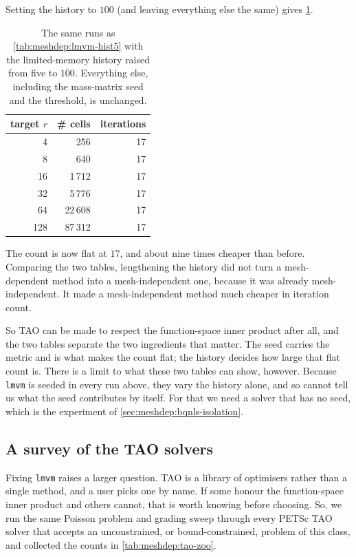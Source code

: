 \documentclass[a4paper,11pt]{article}
\theoremstyle{spacedplain} \newtheorem{theorem}[counter]{Theorem} \newtheorem{lemma}[counter]{Lemma} \newtheorem{prop}[counter]{Proposition} \newtheorem{cor}[counter]{Corollary}
\theoremstyle{spaceddefinition} \newtheorem{defn}[counter]{Definition} \newtheorem{example}[counter]{Example} \newtheorem{remark}[counter]{Remark}
\begin{document}
Setting the history to $100$ (and leaving everything else the same) gives \cref{tab:meshdep:lmvm-hist100}.

\begin{table}[H]
  \centering
  \begin{tabular}{r r r}
    \toprule
    {target $r$} & {\# cells} & {iterations} \\
    \midrule
      4 &     256 & 17 \\
      8 &     640 & 17 \\
     16 &   1\,712 & 17 \\
     32 &   5\,776 & 17 \\
     64 &  22\,608 & 17 \\
    128 &  87\,312 & 17 \\
    \bottomrule
  \end{tabular}
  \caption{The same runs as \cref{tab:meshdep:lmvm-hist5} with the limited-memory history raised from five to $100$. Everything else, including the mass-matrix seed and the threshold, is unchanged.}
  \label{tab:meshdep:lmvm-hist100}
\end{table}

The count is now flat at $17$, and about nine times cheaper than before. Comparing the two tables, lengthening the history did not turn a mesh-dependent method into a mesh-independent one, because it was already mesh-independent. It made a mesh-independent method much cheaper in iteration count.

So TAO can be made to respect the function-space inner product after all, and the two tables separate the two ingredients that matter. The seed carries the metric and is what makes the count flat; the history decides how large that flat count is. There is a limit to what these two tables can show, however. Because \texttt{lmvm} is seeded in every run above, they vary the history alone, and so cannot tell us what the seed contributes by itself. For that we need a solver that has no seed, which is the experiment of \cref{sec:meshdep:bqnls-isolation}.


\subsection{A survey of the TAO solvers}
\label{sec:meshdep:tao-zoo}

Fixing \texttt{lmvm} raises a larger question. TAO is a library of optimisers rather than a single method, and a user picks one by name. If some honour the function-space inner product and others cannot, that is worth knowing before choosing. So, we run the same Poisson problem and grading sweep through every PETSc TAO solver that accepts an unconstrained, or bound-constrained, problem of this class, and collected the counts in \cref{tab:meshdep:tao-zoo}.
\end{document}
